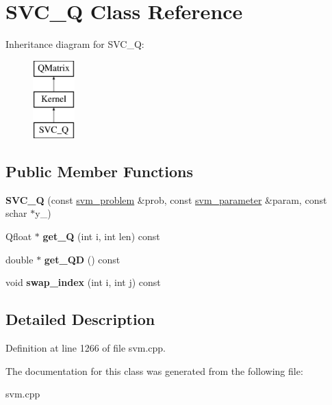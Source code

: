 \hypertarget{class_s_v_c___q}{
\section{SVC\_\-Q Class Reference}
\label{class_s_v_c___q}
}
Inheritance diagram for SVC\_\-Q:\begin{figure}[H]
\begin{center}
\leavevmode
\includegraphics[height=3cm]{class_s_v_c___q}
\end{center}
\end{figure}
\subsection*{Public Member Functions}
\begin{DoxyCompactItemize}
\item 
\hypertarget{class_s_v_c___q_a23d7cf0b0606ccf2cb987205b94dddc7}{
{\bfseries SVC\_\-Q} (const \hyperlink{structsvm__problem}{svm\_\-problem} \&prob, const \hyperlink{structsvm__parameter}{svm\_\-parameter} \&param, const schar $\ast$y\_\-)}
\label{class_s_v_c___q_a23d7cf0b0606ccf2cb987205b94dddc7}

\item 
\hypertarget{class_s_v_c___q_a9341b6030b3fdc88466e4a602b5abff0}{
Qfloat $\ast$ {\bfseries get\_\-Q} (int i, int len) const }
\label{class_s_v_c___q_a9341b6030b3fdc88466e4a602b5abff0}

\item 
\hypertarget{class_s_v_c___q_ac73020a6e438e209d63223e1fa8cac29}{
double $\ast$ {\bfseries get\_\-QD} () const }
\label{class_s_v_c___q_ac73020a6e438e209d63223e1fa8cac29}

\item 
\hypertarget{class_s_v_c___q_a9c889db8ee0156ed5bcdaa4d6bc4e245}{
void {\bfseries swap\_\-index} (int i, int j) const }
\label{class_s_v_c___q_a9c889db8ee0156ed5bcdaa4d6bc4e245}

\end{DoxyCompactItemize}


\subsection{Detailed Description}


Definition at line 1266 of file svm.cpp.



The documentation for this class was generated from the following file:\begin{DoxyCompactItemize}
\item 
svm.cpp\end{DoxyCompactItemize}
